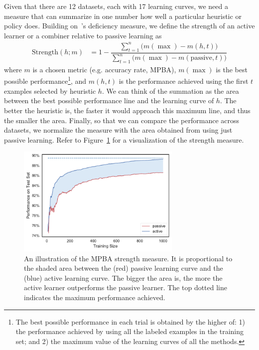 \documentclass[fleqn,10pt,lineno]{wlpeerj} %
\newcommand{\passive}{\text{passive}}
\begin{document}
Given that there are 12 datasets, each with 17 learning curves, we need a
measure that can summarize in one number how well a particular heuristic or
policy does. Building on~\cite{baram04}'s deficiency measure, we define the
strength of an active learner or a combiner relative to passive learning as
\begin{align}
    \text{Strength}(h; m) &=
    	1 - \dfrac{\sum_{t=1}^{n}\big(m(\max) - m(h, t)\big)}
    	{\sum_{t=1}^{n}\big(m(\max) - m(\passive, t)\big)}
\end{align}
where $m$ is a chosen metric (e.g. accuracy rate, MPBA), $m(\max)$ is the best
possible performance\footnote{The best possible performance in each trial is
obtained by the higher of: 1) the performance achieved by using all the labeled
examples in the training set; and 2) the maximum value of the learning curves
of all the methods.}, and $m(h, t)$ is the performance achieved using the first
$t$ examples selected by heuristic $h$. We can think of the summation as the
area between the best possible performance line and the learning curve of $h$.
The better the heuristic is, the faster it would approach this maximum line,
and thus the smaller the area. Finally, so that we can compare the performance
across datasets, we normalize the measure with the area obtained from using
just passive learning. Refer to Figure~\ref{fig:strength} for a visualization
of the strength measure.

\begin{figure}[htbp]
	\centering
	\includegraphics[width=0.7\textwidth]{Fig3}
	\caption[Strength Measure]{An illustration of the MPBA strength measure. It
	is proportional to the shaded area between the (red) passive learning curve
	and the (blue) active learning curve. The bigger the area is, the more the
	active learner outperforms the passive learner. The top dotted line
	indicates the maximum performance achieved.}
	\label{fig:strength}
\end{figure}
\end{document}
